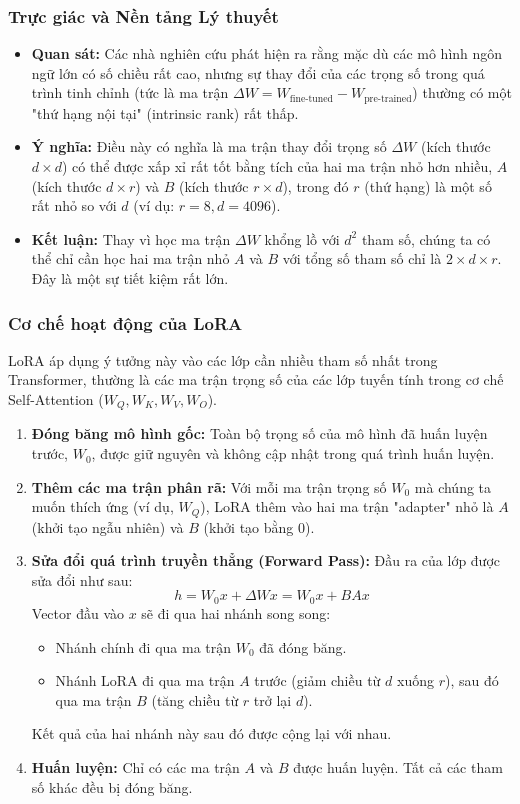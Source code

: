 \subsubsection{Trực giác và Nền tảng Lý thuyết}
\begin{itemize}
    \item \textbf{Quan sát:} Các nhà nghiên cứu phát hiện ra rằng mặc dù các mô hình ngôn ngữ lớn có số chiều rất cao, nhưng sự thay đổi của các trọng số trong quá trình tinh chỉnh (tức là ma trận $\Delta W = W_{\text{fine-tuned}} - W_{\text{pre-trained}}$) thường có một "thứ hạng nội tại" (intrinsic rank) rất thấp.
    \item \textbf{Ý nghĩa:} Điều này có nghĩa là ma trận thay đổi trọng số $\Delta W$ (kích thước $d \times d$) có thể được xấp xỉ rất tốt bằng tích của hai ma trận nhỏ hơn nhiều, $A$ (kích thước $d \times r$) và $B$ (kích thước $r \times d$), trong đó $r$ (thứ hạng) là một số rất nhỏ so với $d$ (ví dụ: $r=8, d=4096$).
    \item \textbf{Kết luận:} Thay vì học ma trận $\Delta W$ khổng lồ với $d^2$ tham số, chúng ta có thể chỉ cần học hai ma trận nhỏ $A$ và $B$ với tổng số tham số chỉ là $2 \times d \times r$. Đây là một sự tiết kiệm rất lớn.
\end{itemize}

\subsubsection{Cơ chế hoạt động của LoRA}
LoRA áp dụng ý tưởng này vào các lớp cần nhiều tham số nhất trong Transformer, thường là các ma trận trọng số của các lớp tuyến tính trong cơ chế Self-Attention ($W_Q, W_K, W_V, W_O$).
\begin{enumerate}
    \item \textbf{Đóng băng mô hình gốc:} Toàn bộ trọng số của mô hình đã huấn luyện trước, $W_0$, được giữ nguyên và không cập nhật trong quá trình huấn luyện.
    \item \textbf{Thêm các ma trận phân rã:} Với mỗi ma trận trọng số $W_0$ mà chúng ta muốn thích ứng (ví dụ, $W_Q$), LoRA thêm vào hai ma trận "adapter" nhỏ là $A$ (khởi tạo ngẫu nhiên) và $B$ (khởi tạo bằng 0).
    \item \textbf{Sửa đổi quá trình truyền thẳng (Forward Pass):} Đầu ra của lớp được sửa đổi như sau:
        $$ h = W_0 x + \Delta W x = W_0 x + BAx $$
        Vector đầu vào $x$ sẽ đi qua hai nhánh song song:
        \begin{itemize}
            \item Nhánh chính đi qua ma trận $W_0$ đã đóng băng.
            \item Nhánh LoRA đi qua ma trận $A$ trước (giảm chiều từ $d$ xuống $r$), sau đó qua ma trận $B$ (tăng chiều từ $r$ trở lại $d$).
        \end{itemize}
        Kết quả của hai nhánh này sau đó được cộng lại với nhau.
    \item \textbf{Huấn luyện:} Chỉ có các ma trận $A$ và $B$ được huấn luyện. Tất cả các tham số khác đều bị đóng băng.
\end{enumerate}

